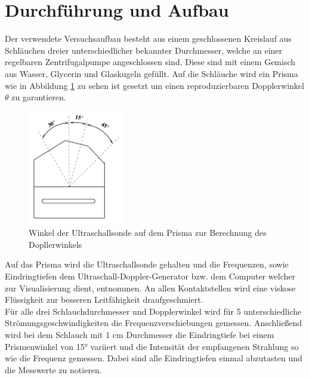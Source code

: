 \section{Durchführung und Aufbau}
\label{sec:Durchführung}
Der verwendete Versuchsaufbau besteht aus einem geschlossenen Kreislauf aus Schläuchen dreier unterschiedlicher bekannter Durchmesser, welche an einer regelbaren Zentrifugalpumpe angeschlossen sind. Diese sind mit einem Gemisch aus Wasser, Glycerin und Glaskugeln gefüllt. Auf die Schläuche wird ein Prisma wie in Abbildung \ref{fig:Doppler} zu sehen ist gesetzt um einen reproduzierbaren Dopplerwinkel $\theta$ zu garantieren.
\begin{figure}
  \centering
  \includegraphics[height=5cm]{picture/Winkel.png}
  \caption{Winkel der Ultraschallsonde auf dem Prisma zur Berechnung des Dopllerwinkels}
  \label{fig:Doppler}
\end{figure}
Auf das Prisma wird die Ultraschallsonde gehalten und die Frequenzen, sowie Eindringtiefen dem Ultraschall-Doppler-Generator bzw. dem Computer welcher zur Visualisierung dient, entnommen. An allen Kontaktstellen wird eine viskose Flüssigkeit zur besseren Leitfähigkeit draufgeschmiert.	\\
Für alle drei Schlauchdurchmesser und Dopplerwinkel wird für 5 unterschiedliche Strömungsgeschwindigkeiten die Frequenzverschiebungen gemessen. Anschließend wird bei dem Schlauch mit 1 cm Durchmesser die Eindringtiefe bei einem Prismenwinkel von 15° variiert und die Intensität der empfangenen Strahlung so wie die Frequenz gemessen. Dabei sind alle Eindringtiefen einmal abzutasten und die Messwerte zu notieren. 
